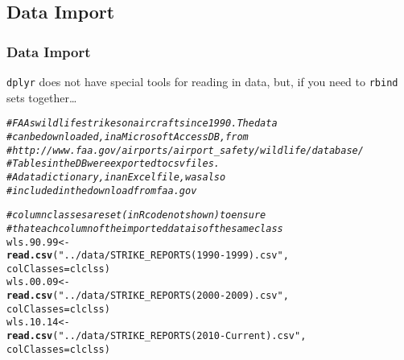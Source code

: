 \documentclass{beamer}\usepackage[]{graphicx}\usepackage[]{color}
\makeatletter
\newcommand{\hlstr}[1]{\textcolor[rgb]{0.192,0.494,0.8}{#1}}%
\newcommand{\hlcom}[1]{\textcolor[rgb]{0.678,0.584,0.686}{\textit{#1}}}%
\newcommand{\hlstd}[1]{\textcolor[rgb]{0.345,0.345,0.345}{#1}}%
\newcommand{\hlkwb}[1]{\textcolor[rgb]{0.69,0.353,0.396}{#1}}%
\newcommand{\hlkwc}[1]{\textcolor[rgb]{0.333,0.667,0.333}{#1}}%
\newcommand{\hlkwd}[1]{\textcolor[rgb]{0.737,0.353,0.396}{\textbf{#1}}}%
\newenvironment{kframe}{%
 \def\at@end@of@kframe{}%
 \ifinner\ifhmode%
  \def\at@end@of@kframe{\end{minipage}}%
  \begin{minipage}{\columnwidth}%
 \fi\fi%
 \def\FrameCommand##1{\hskip\@totalleftmargin \hskip-\fboxsep
 \colorbox{shadecolor}{##1}\hskip-\fboxsep
     \hskip-\linewidth \hskip-\@totalleftmargin \hskip\columnwidth}%
 \MakeFramed {\advance\hsize-\width
   \@totalleftmargin\z@ \linewidth\hsize
   \@setminipage}}%
 {\par\unskip\endMakeFramed%
 \at@end@of@kframe}
\newenvironment{knitrout}{}{} %
\makeatother
\begin{document}
\subsection{Data Import}%

\begin{frame}[fragile]
  \frametitle{Data Import}
  {\tt dplyr} does not have special tools for reading in data, but, if you need
  to {\tt rbind} sets together\ldots 



\begin{knitrout}\footnotesize
{}\color{fgcolor}\begin{kframe}
\begin{alltt}
\hlcom{# FAAs wildlife strikes on aircraft since 1990.  The data}
\hlcom{# can be downloaded, in a Microsoft Access DB,  from}
\hlcom{# http://www.faa.gov/airports/airport_safety/wildlife/database/}
\hlcom{# Tables in the DB were exported to csv files.  }
\hlcom{# A data dictionary, in an Excel file, was also}
\hlcom{# included in the download from faa.gov}

\hlcom{# column classes are set (in R code not shown) to ensure}
\hlcom{# that each column of the imported data is of the same class}
\hlstd{wls.90.99} \hlkwb{<-}
  \hlkwd{read.csv}\hlstd{(}\hlstr{"../data/STRIKE_REPORTS (1990-1999).csv"}\hlstd{,}
           \hlkwc{colClasses} \hlstd{= clclss)}
\hlstd{wls.00.09} \hlkwb{<-}
  \hlkwd{read.csv}\hlstd{(}\hlstr{"../data/STRIKE_REPORTS (2000-2009).csv"}\hlstd{,}
           \hlkwc{colClasses} \hlstd{= clclss)}
\hlstd{wls.10.14} \hlkwb{<-}
  \hlkwd{read.csv}\hlstd{(}\hlstr{"../data/STRIKE_REPORTS (2010-Current).csv"}\hlstd{,}
           \hlkwc{colClasses} \hlstd{= clclss)}
\end{alltt}
\end{kframe}
\end{knitrout}
\end{frame} 
\end{document}
